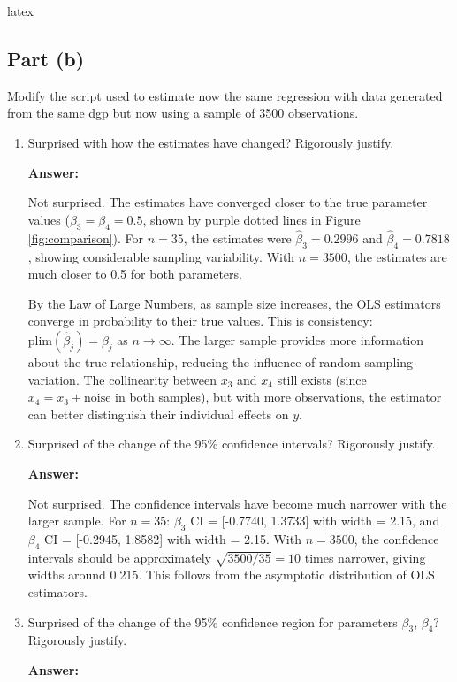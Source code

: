 \documentclass[12pt,a4paper]{article}
\begin{document}
latex\subsection*{Part (b)}
Modify the script used to estimate now the same regression with data 
generated from the same dgp but now using a sample of 3500 observations.

\begin{enumerate}[label=(\roman*)]
  \item Surprised with how the estimates have changed? Rigorously justify.
  
  \textbf{Answer:} 
  
  Not surprised. The estimates have converged closer to the true parameter 
  values ($\beta_3=\beta_4=0.5$, shown by purple dotted lines in Figure 
  \ref{fig:comparison}). For $n=35$, the estimates were $\hat{\beta}_3=0.2996$ 
  and $\hat{\beta}_4=0.7818$, showing considerable sampling variability. 
  With $n=3500$, the estimates are much closer to 0.5 for both parameters.
  
  By the Law of Large Numbers, as sample size increases, the OLS estimators 
  converge in probability to their true values. This is consistency: 
  $\text{plim}(\hat{\beta}_j) = \beta_j$ as $n \to \infty$. The larger 
  sample provides more information about the true relationship, reducing 
  the influence of random sampling variation. The collinearity between $x_3$ 
  and $x_4$ still exists (since $x_4 = x_3 + \text{noise}$ in both samples), 
  but with more observations, the estimator can better distinguish their 
  individual effects on $y$.
  
  
  \item Surprised of the change of the 95\% confidence intervals? Rigorously justify.
  
  \textbf{Answer:} 

  Not surprised. The confidence intervals have become much narrower with the larger sample. 
  For $n=35$: $\beta_3$ CI = [-0.7740, 1.3733] with width = 2.15, and $\beta_4$ CI = [-0.2945, 1.8582] with width = 2.15.
  With $n=3500$, the confidence intervals should be approximately $\sqrt{3500/35} = 10$ times narrower, giving widths around 0.215.
  This follows from the asymptotic distribution of OLS estimators.

  \item Surprised of the change of the 95\% confidence region for parameters $\beta_3$, $\beta_4$? Rigorously justify.
  
  \textbf{Answer:} 
  

\end{enumerate}
\end{document}
